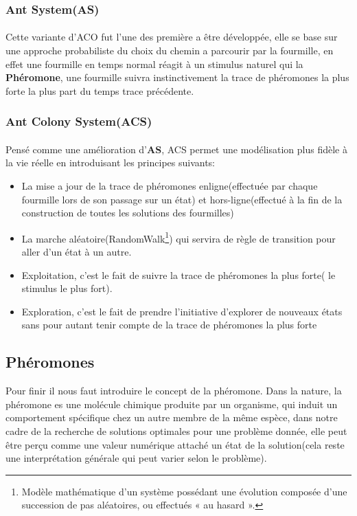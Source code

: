 \subsubsection{Ant System(AS)}
\paragraph{}\label{AS}
Cette variante d'ACO fut l'une des première a être développée, elle se base sur une approche probabiliste du choix du chemin a parcourir par la fourmille, en effet une fourmille en temps normal réagit à un stimulus naturel qui la \textbf{Phéromone}, une fourmille suivra instinctivement la trace de phéromones la plus forte la plus part du temps trace précédente.

\subsubsection{Ant Colony System(ACS)}
\paragraph{}\label{ACS}
Pensé comme une amélioration d'\textbf{AS}, ACS permet une modélisation plus fidèle à la vie réelle en introduisant les principes suivants: 
\begin{itemize}
	\item La mise a jour de la trace de phéromones enligne(effectuée par chaque fourmille lors de son passage sur un état) et hors-ligne(effectué à la fin de la construction de toutes les solutions des fourmilles)
	\item La marche aléatoire(RandomWalk\footnote{Modèle mathématique  d'un système possédant une évolution composée d'une succession de pas aléatoires, ou effectués « au hasard ».}) qui servira de règle de transition pour aller d'un état à un autre.
	\item Exploitation, c'est le fait de suivre la trace de phéromones la plus forte( le stimulus le plus fort).
	\item Exploration, c'est le fait de prendre l'initiative d'explorer de nouveaux états sans pour autant tenir compte de la trace de phéromones la plus forte
\end{itemize}


\subsection{Phéromones}
Pour finir il nous faut introduire le concept de la phéromone. Dans la nature, la phéromone es une molécule chimique produite par un organisme, qui induit un comportement spécifique chez un autre membre de la même espèce, dans notre cadre de la recherche de solutions optimales pour une problème donnée, elle peut être perçu comme une valeur numérique attaché un état de la solution(cela reste une interprétation générale qui peut varier selon le problème).



